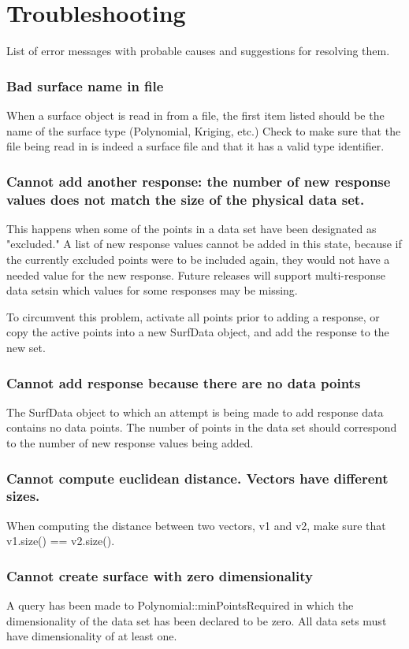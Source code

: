 \documentclass{article}
\begin{document}
\section{Troubleshooting}\label{sec:troubleshooting}
List of error messages with probable causes and suggestions for resolving them.

\subsubsection{Bad surface name in file}
When a surface object is read in from a file, the first item listed should be
the name of the surface type (Polynomial, Kriging, etc.) Check to make sure that
the file being read in is indeed a surface file and that it has a valid type
identifier.

\subsubsection{Cannot add another response: the number of new response values does not match the size of the physical data set.}
This happens when some of the points in a data set have been designated as
"excluded."  A list of new response values cannot be added in this state,
because if the currently excluded points were to be included again, they would
not have a needed value for the new response.  Future releases will support
multi-response data setsin which values for some responses may be missing.

To circumvent this problem, activate all points prior to adding a response, or
copy the active points into a new SurfData object, and add the response to the
new set.


\subsubsection{Cannot add response because there are no data points}
The SurfData object to which an attempt is being made to add response data
contains no data points.  The number of points in the data set should correspond
to the number of new response values being added.

\subsubsection{Cannot compute euclidean distance. Vectors have different sizes.}
When computing the distance between two vectors, v1 and v2, make sure that
v1.size() == v2.size().

\subsubsection{Cannot create surface with zero dimensionality}
A query has been made to Polynomial::minPointsRequired in which the
dimensionality of the data set has been declared to be zero.  All data sets must
have dimensionality of at least one.
\end{document}
